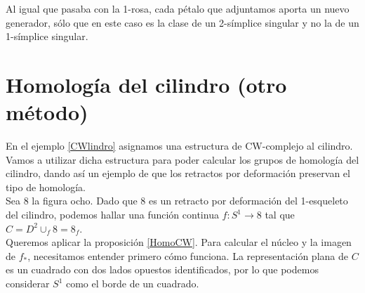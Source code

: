 Al igual que pasaba con la 1-rosa, cada pétalo que adjuntamos aporta un nuevo generador, sólo que en este caso es la clase de un 2-símplice singular y no la de un 1-símplice singular.

\section{Homología del cilindro (otro método)}
En el ejemplo \ref{CWlindro} asignamos una estructura de CW-complejo al cilindro. Vamos a utilizar dicha estructura para poder calcular los grupos de homología del cilindro, dando así un ejemplo de que los retractos por deformación preservan el tipo de homología.
\\

Sea $8$ la figura ocho. Dado que $8$ es un retracto por deformación del 1-esqueleto del cilindro, podemos hallar una función continua $f: S^1 \longrightarrow 8$ tal que $C=D^2 \cup_f 8=8_f$.
\\

Queremos aplicar la proposición \ref{HomoCW}. Para calcular el núcleo y la imagen de $f_*$, necesitamos entender primero cómo funciona. La representación plana de $C$ es un cuadrado con dos lados opuestos identificados, por lo que podemos considerar $S^1$ como el borde de un cuadrado.
\\

